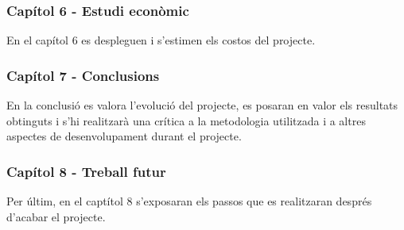 {    \subsubsection*{ Capítol 6 - Estudi econòmic }
    {
        En el capítol 6 es despleguen i s'estimen els costos del projecte.
    }
    
    \subsubsection*{ Capítol 7 - Conclusions }
    {
        En la conclusió es valora l'evolució del projecte, es posaran en valor
        els resultats obtinguts i s'hi realitzarà una crítica a la metodologia
        utilitzada i a altres aspectes de desenvolupament durant el projecte.
    }
    
    \subsubsection*{ Capítol 8 - Treball futur }
    {
        Per últim, en el captítol 8 s'exposaran els passos que es realitzaran
        després d'acabar el projecte.
    }
}